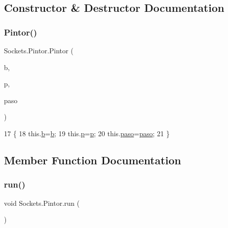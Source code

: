 \subsection{Constructor \& Destructor Documentation}
\mbox{\label{class_sockets_1_1_pintor_a7ec9ea9ba4e21c302383a8d55c3cd97d}} 
\subsubsection{\texorpdfstring{Pintor()}{Pintor()}}
{\footnotesize\ttfamily Sockets.\+Pintor.\+Pintor (\begin{DoxyParamCaption}\item[{J\+Button}]{b,  }\item[{\mbox{\hyperlink{class_sockets_1_1_paleta}{Paleta}}}]{p,  }\item[{\mbox{\hyperlink{class_sockets_1_1_paso}{Paso}}}]{paso }\end{DoxyParamCaption})\hspace{0.3cm}{\ttfamily [inline]}}


\begin{DoxyCode}
17     \{
18         this.\mbox{\hyperlink{class_sockets_1_1_pintor_a2b07cfc2a0f93afd9841f74ade3a61f8}{b}}=\mbox{\hyperlink{class_sockets_1_1_pintor_a2b07cfc2a0f93afd9841f74ade3a61f8}{b}};
19         this.\mbox{\hyperlink{class_sockets_1_1_pintor_a92e89c1dc89460b6da4128e8fd6a45ec}{p}}=\mbox{\hyperlink{class_sockets_1_1_pintor_a92e89c1dc89460b6da4128e8fd6a45ec}{p}};
20         this.\mbox{\hyperlink{class_sockets_1_1_pintor_a2107c61fca16f1e39d835ac82eaf7f4d}{paso}}=\mbox{\hyperlink{class_sockets_1_1_pintor_a2107c61fca16f1e39d835ac82eaf7f4d}{paso}};
21     \}
\end{DoxyCode}


\subsection{Member Function Documentation}
\mbox{\label{class_sockets_1_1_pintor_a7203e551c81501d2b04622d76ed1bf46}} 
\subsubsection{\texorpdfstring{run()}{run()}}
{\footnotesize\ttfamily void Sockets.\+Pintor.\+run (\begin{DoxyParamCaption}{ }\end{DoxyParamCaption})\hspace{0.3cm}{\ttfamily [inline]}}


